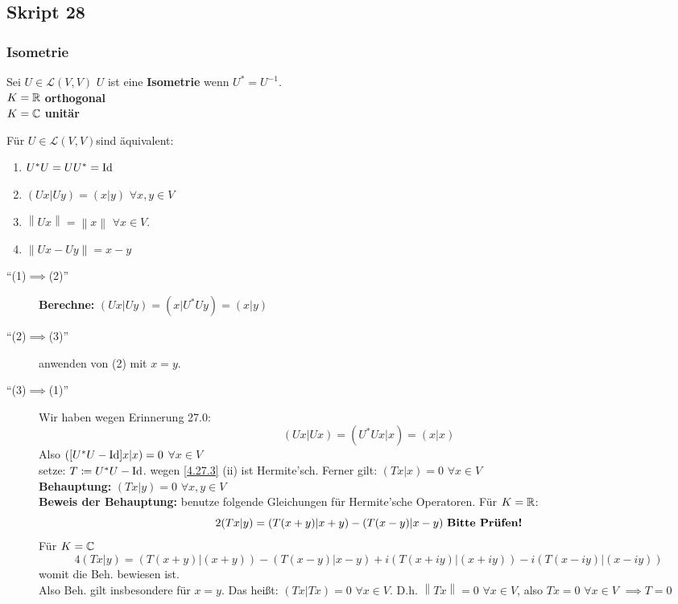 \subsection{Skript 28}
\setcounter{subsubsection}{18}
\subsubsection{Isometrie}
\begin{subdefinition}
	Sei $ U \in \mathcal{L} (V, V) $ $ U $ ist eine \textbf{Isometrie} wenn $ U^* = U^{-1}  $.\\
	$ K = \mathbb{R}  $ \textbf{orthogonal}\\
	$ K = \mathbb{C}  $ \textbf{unitär}
\end{subdefinition}

\setcounter{subenvironmentnumber}{1}
\begin{subtheorem}
	Für $ U \in \mathcal{L} (V, V) $sind äquivalent:
	\begin{enumerate}[label=(\arabic*)]
		\item $ U^* U = U U^* = \operatorname{Id} $ 
		\item $ (Ux|Uy) = (x|y) $ $ \forall x, y \in V $ 
		\item $ \left\| Ux \right\| = \left\| x \right\|  $ $ \forall x \in V $.
		\item $ \left\| Ux - Uy \right\| = x - y $
	\end{enumerate}
\end{subtheorem}
\begin{subproof*}
	\begin{description}
		\item[``(1)$ \implies  $(2)'']
			\textbf{Berechne:} $ (Ux | Uy) = (x | U^* U y) = (x | y) $
		\item[``(2)$ \implies  $(3)'']
			anwenden von (2) mit $ x = y $.
		\item[``(3)$ \implies  $(1)'']
			Wir haben wegen Erinnerung 27.0:
			\[
				\left( Ux | Ux \right) = (U^* U x | x) = (x | x)
			\]
			Also $ \left( [U^* U - \operatorname{Id}]x | x \right) = 0 $ $ \forall x \in V $\\
			setze: $ T \coloneqq U^* U  - \operatorname{Id} $. wegen \ref{4.27.3} (ii) ist Hermite'sch.
			Ferner gilt: $ (Tx|x) = 0 $ $ \forall x \in V $\\
			\textbf{Behauptung:} $ (Tx|y) = 0 $ $ \forall x, y \in V $\\
			\textbf{Beweis der Behauptung:} benutze folgende Gleichungen für Hermite'sche Operatoren.
			Für $ K = \mathbb{R}  $:
			\[
				2(Tx|y) = (T(x + y) | x + y) - (T(x - y)| x - y) \text{ \textbf{Bitte Prüfen!}} 
			\]
			Für $ K = \mathbb{C}  $ 
			\[
				4(Tx|y) = (T(x + y)| (x + y)) - (T(x - y) | x - y) + i(T(x + iy)|(x + iy)) - i(T(x - iy)|(x - iy))
			\]
			womit die Beh. bewiesen ist.\\
			Also Beh. gilt insbesondere für $ x = y $. Das heißt: $ (Tx | Tx) = 0 $ $ \forall x \in V $. D.h. $ \left\| Tx \right\| = 0 $ $ \forall x \in V $, also $ Tx = 0 $ $ \forall x \in V $ $ \implies T = 0 $
	\end{description}
\end{subproof*}

